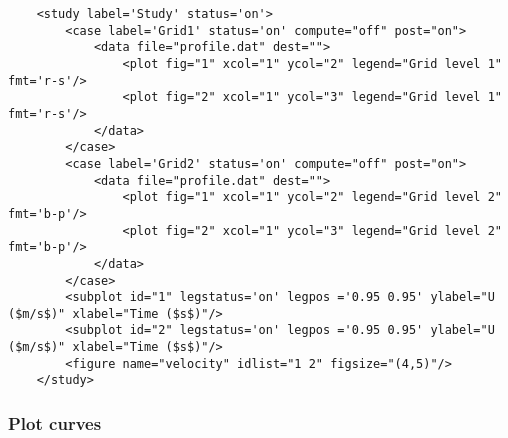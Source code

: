 \documentclass[a4paper,10pt,twoside]{article}
\begin{document}
\begin{verbatim}
    <study label='Study' status='on'>
        <case label='Grid1' status='on' compute="off" post="on">
            <data file="profile.dat" dest="">
                <plot fig="1" xcol="1" ycol="2" legend="Grid level 1" fmt='r-s'/>
                <plot fig="2" xcol="1" ycol="3" legend="Grid level 1" fmt='r-s'/>
            </data>
        </case>
        <case label='Grid2' status='on' compute="off" post="on">
            <data file="profile.dat" dest="">
                <plot fig="1" xcol="1" ycol="2" legend="Grid level 2" fmt='b-p'/>
                <plot fig="2" xcol="1" ycol="3" legend="Grid level 2" fmt='b-p'/>
            </data>
        </case>
        <subplot id="1" legstatus='on' legpos ='0.95 0.95' ylabel="U ($m/s$)" xlabel="Time ($s$)"/>
        <subplot id="2" legstatus='on' legpos ='0.95 0.95' ylabel="U ($m/s$)" xlabel="Time ($s$)"/>
        <figure name="velocity" idlist="1 2" figsize="(4,5)"/>
    </study>
\end{verbatim}

\subsubsection{Plot curves}
\end{document}
